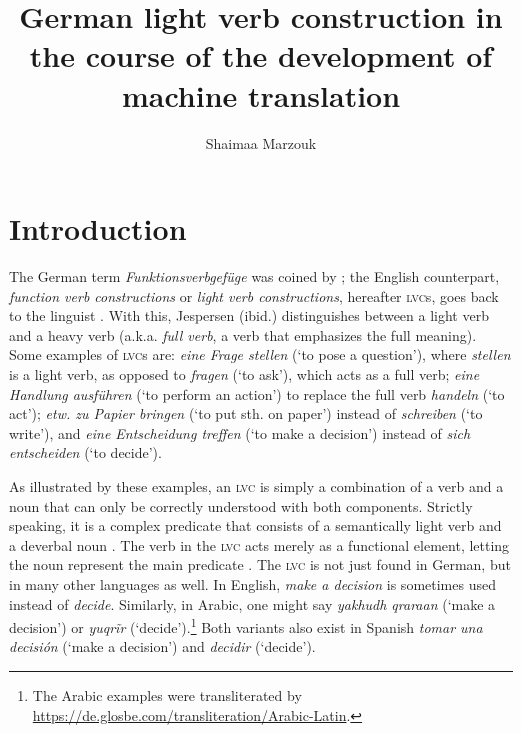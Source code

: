 \documentclass[output=paper]{langsci/langscibook}
\author{Shaimaa Marzouk\affiliation{Johannes Gutenberg University Mainz}}
\title[German light verb construction in the course of the development of MT]
      {German light verb construction in the course of the development of machine translation}
\begin{document}
\maketitle

\section{Introduction}\label{marzouk:introduction}

The German term \textit{Funktionsverbgefüge} was coined by \citet[26]{vonPolenz1963}; the English counterpart, \textit{function verb constructions} or \textit{light verb constructions}, hereafter \textsc{lvc}s, goes back to the linguist \citet[117]{Jespersen1942}. With this, Jespersen (ibid.) distinguishes between a light verb and a heavy verb (a.k.a. \textit{full verb}, a verb that emphasizes the full meaning). Some examples of \textsc{lvc}s are: 
\textit{eine Frage stellen} (`to pose a question'), where \textit{stellen} is a light verb, as opposed to \textit{fragen} (`to ask'), which acts as a full verb; \textit{eine Handlung ausführen} (`to perform an action') to replace the full verb \textit{handeln} (`to act'); \textit{etw. zu Papier bringen} (`to put sth. on paper') instead of \textit{schreiben} (`to write'), and \textit{eine Entscheidung treffen} (`to make a decision') instead of \textit{sich entscheiden} (`to decide'). 

As illustrated by these examples, an \textsc{lvc} is simply a combination of a verb and a noun that can only be correctly understood with both components. Strictly speaking, it is a complex predicate that consists of a semantically light verb and a deverbal noun \citep[117]{Jespersen1964}. The verb in the \textsc{lvc} acts merely as a functional element, letting the noun represent the main predicate \citep{Grimshaw1988}. The \textsc{lvc} is not just found in German, but in many other languages as well. In English, \textit{make a decision} is sometimes used instead of \textit{decide}. Similarly, in Arabic, one might say \textit{yakhudh qraraan} (`make a decision') or  \textit{yuqrĩr} (`decide').\footnote{The Arabic examples were transliterated by \url{https://de.glosbe.com/transliteration/Arabic-Latin}.} Both variants also exist in Spanish \textit{tomar una decisión} (`make a decision') and \textit{decidir} (`decide').
\end{document}
